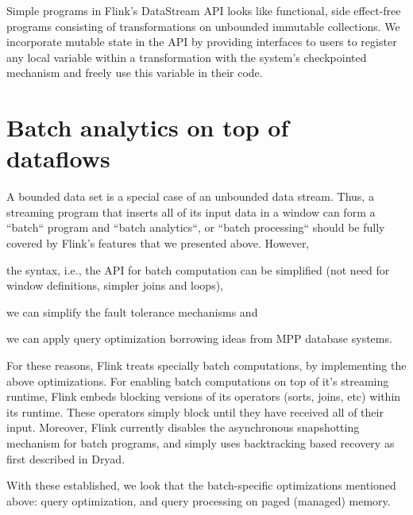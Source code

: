 \documentclass[11pt]{article}
\begin{document}
Simple programs in Flink's DataStream API looks like functional, side effect-free programs consisting of transformations on unbounded immutable collections. We incorporate mutable state in the API by providing interfaces to users to register any local variable within a transformation with the system's checkpointed mechanism and freely use this variable in their code. 


\section{Batch analytics on top of \\ dataflows}

A bounded data set is a special case of an unbounded data stream. Thus, a streaming program that inserts all of its input data in a window can form a ``batch`` program and ``batch analytics``, or ``batch processing`` should be fully covered by Flink's features that we presented above. However, \begin{inparaenum}[i)]
  \item the syntax, i.e., the API for batch computation can be simplified (not need for window definitions, simpler joins and loops),
  \item we can simplify the fault tolerance mechanisms and
  \item we can apply query optimization borrowing ideas from MPP database systems.
\end{inparaenum}
For these reasons, Flink treats specially batch computations, by implementing the above optimizations. For enabling batch computations on top of it's streaming runtime, Flink embeds blocking versions of its operators (sorts, joins, etc) within its runtime. These operators simply block until they have received all of their input. Moreover, Flink currently disables the asynchronous snapshotting mechanism for batch programs, and simply uses backtracking based recovery as first described in Dryad.~\cite{isard2007dryad}

With these established, we look that the batch-specific optimizations mentioned above: query optimization, and query processing on paged (managed) memory.
\end{document}
